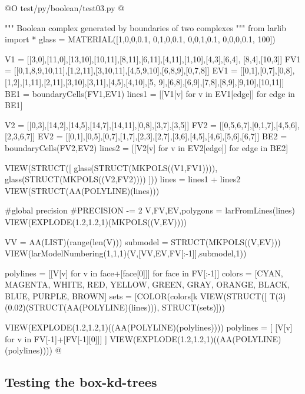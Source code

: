 \documentclass[11pt,oneside]{article}    %
\begin{document}
@O test/py/boolean/test03.py
@{""" Boolean complex generated by boundaries of two complexes """
from larlib import *
glass = MATERIAL([1,0,0,0.1,  0,1,0,0.1,  0,0,1,0.1, 0,0,0,0.1, 100])

V1 = [[3,0],[11,0],[13,10],[10,11],[8,11],[6,11],[4,11],[1,10],[4,3],[6,4],
        [8,4],[10,3]]
FV1 = [[0,1,8,9,10,11],[1,2,11],[3,10,11],[4,5,9,10],[6,8,9],[0,7,8]]
EV1 = [[0,1],[0,7],[0,8],[1,2],[1,11],[2,11],[3,10],[3,11],[4,5],[4,10],[5,
        9],[6,8],[6,9],[7,8],[8,9],[9,10],[10,11]]
BE1 = boundaryCells(FV1,EV1)
lines1 = [[V1[v] for v in EV1[edge]] for edge in BE1]

V2 = [[0,3],[14,2],[14,5],[14,7],[14,11],[0,8],[3,7],[3,5]]
FV2 = [[0,5,6,7],[0,1,7],[4,5,6],[2,3,6,7]]
EV2 = [[0,1],[0,5],[0,7],[1,7],[2,3],[2,7],[3,6],[4,5],[4,6],[5,6],[6,7]]
BE2 = boundaryCells(FV2,EV2)
lines2 = [[V2[v] for v in EV2[edge]] for edge in BE2]

VIEW(STRUCT([ glass(STRUCT(MKPOLS((V1,FV1)))), glass(STRUCT(MKPOLS((V2,FV2)))) ]))
lines = lines1 + lines2
VIEW(STRUCT(AA(POLYLINE)(lines)))

#global precision
#PRECISION -= 2
V,FV,EV,polygons = larFromLines(lines)
VIEW(EXPLODE(1.2,1.2,1)(MKPOLS((V,EV))))

VV = AA(LIST)(range(len(V)))
submodel = STRUCT(MKPOLS((V,EV)))
VIEW(larModelNumbering(1,1,1)(V,[VV,EV,FV[:-1]],submodel,1))

polylines = [[V[v] for v in face+[face[0]]] for face in FV[:-1]]
colors = [CYAN, MAGENTA, WHITE, RED, YELLOW, GREEN, GRAY, ORANGE, BLACK, BLUE, PURPLE, BROWN]
sets = [COLOR(colors[k%
VIEW(STRUCT([ T(3)(0.02)(STRUCT(AA(POLYLINE)(lines))), STRUCT(sets)]))

VIEW(EXPLODE(1.2,1.2,1)((AA(POLYLINE)(polylines))))
polylines = [ [V[v] for v in FV[-1]+[FV[-1][0]]] ]
VIEW(EXPLODE(1.2,1.2,1)((AA(POLYLINE)(polylines))))
@}



\subsection{Testing the box-kd-trees}
\end{document}
